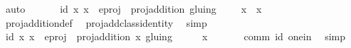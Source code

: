 \begin{isabellebody}
\ auto\isanewline
\ \ \isanewline
\ \ \isamarkupfalse%
\ id{\isacharunderscore}{}{\isacharcolon}\ {\isachardoublequoteopen}{\isasymAnd}x{\isachardot}\ x\ {\isasymin}\ e{\isacharunderscore}proj\ {\isasymLongrightarrow}\ proj{\isacharunderscore}addition\ {\isacharparenleft}gluing\ {\isacharbackquote}{\isacharbackquote}\ {\isacharbraceleft}{\isacharparenleft}{\isacharparenleft}{}{\isacharcomma}\ {}{\isacharparenright}{\isacharcomma}\ {}{\isacharparenright}{\isacharbraceright}{\isacharparenright}\ x\ {\isacharequal}\ x{\isachardoublequoteclose}\isanewline
\ \ \ \ \isamarkupfalse%
\ proj{\isacharunderscore}addition{\isacharunderscore}def\ \isamarkupfalse%
\ proj{\isacharunderscore}add{\isacharunderscore}class{\isacharunderscore}identity\ \isamarkupfalse%
\ simp\isanewline
\ \ \isanewline
\ \ \isamarkupfalse%
\ id{\isacharunderscore}{}{\isacharcolon}\ {\isachardoublequoteopen}{\isasymAnd}x{\isachardot}\ x\ {\isasymin}\ e{\isacharunderscore}proj\ {\isasymLongrightarrow}\ proj{\isacharunderscore}addition\ x\ {\isacharparenleft}gluing\ {\isacharbackquote}{\isacharbackquote}\ {\isacharbraceleft}{\isacharparenleft}{\isacharparenleft}{}{\isacharcomma}\ {}{\isacharparenright}{\isacharcomma}\ {}{\isacharparenright}{\isacharbraceright}{\isacharparenright}\ {\isacharequal}\ x{\isachardoublequoteclose}\isanewline
\ \ \ \ \ \isamarkupfalse%
\ comm\ id{\isacharunderscore}{}\ one{\isacharunderscore}in\ \isamarkupfalse%
\ simp\isanewline
\ \ \ \isamarkupfalse%
%
\endisatagproof
{\isafoldproof}%
%
\isadelimproof
\isanewline
%
\endisadelimproof
\isanewline
{}\isamarkupfalse%
\isanewline
%
\isadelimtheory
\isanewline
%
\endisadelimtheory
%
\isatagtheory
{}\isamarkupfalse%
%
\endisatagtheory
{\isafoldtheory}%
%
\isadelimtheory
%
\endisadelimtheory
%
\end{isabellebody}%
\endinput
